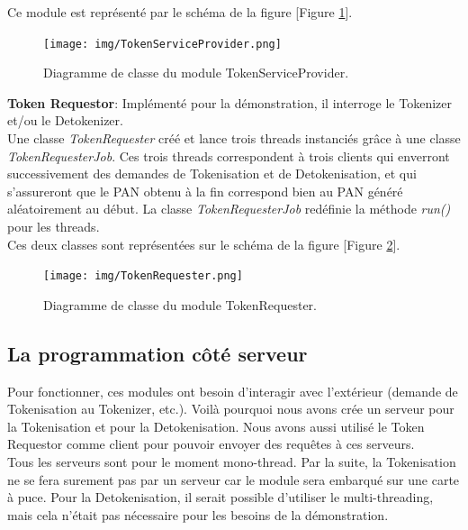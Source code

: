 \documentclass{report}
\begin{document}
\noindent
Ce module est représenté par le schéma de la figure [Figure \ref{ArchitectureTSP}].\\

\begin{figure}[!ht]
    \centering
			\texttt{[image: img/TokenServiceProvider.png]}
			\caption{\label{ArchitectureTSP} Diagramme de classe du module TokenServiceProvider.}			
\end{figure}

\noindent
\textbf{Token Requestor}: Implémenté pour la démonstration, il interroge le Tokenizer et/ou le Detokenizer.\\

\noindent
Une classe \textit{TokenRequester} créé et lance trois threads instanciés grâce à une classe \textit{TokenRequesterJob}. Ces trois threads correspondent à trois clients qui enverront successivement des demandes de Tokenisation et de Detokenisation, et qui s'assureront que le PAN obtenu à la fin correspond bien au PAN généré aléatoirement au début. La classe \textit{TokenRequesterJob} redéfinie la méthode \textit{run()} pour les threads.\\

\noindent
Ces deux classes sont représentées sur le schéma de la figure [Figure \ref{ArchitectureTR}].

\begin{figure}[!ht]
    \centering
			\texttt{[image: img/TokenRequester.png]}
			\caption{\label{ArchitectureTR} Diagramme de classe du module TokenRequester.}			
\end{figure}

\newpage
\subsection{La programmation côté serveur}
Pour fonctionner, ces modules ont besoin d'interagir avec l'extérieur (demande de Tokenisation au Tokenizer, etc.). Voilà pourquoi nous avons crée un serveur pour la Tokenisation et pour la Detokenisation. Nous avons aussi utilisé le Token Requestor comme client pour pouvoir envoyer des requêtes à ces serveurs.\\
Tous les serveurs sont pour le moment mono-thread. Par la suite, la Tokenisation ne se fera surement pas par un serveur car le module sera embarqué sur une carte à puce. Pour la Detokenisation, il serait possible d'utiliser le multi-threading, mais cela n'était pas nécessaire pour les besoins de la démonstration.\\
\end{document}

